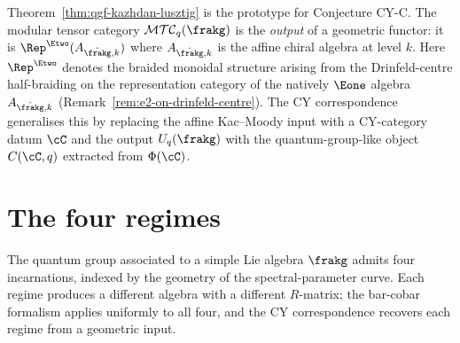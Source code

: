 \begin{remark}
\label{rem:qgf-vol3-standpoint}
Theorem~\ref{thm:qgf-kazhdan-lusztig} is the prototype for Conjecture CY-C. The modular tensor category $\mathcal{MTC}_q(\frakg)$ is the \emph{output} of a geometric functor: it is $\Rep^{\Etwo}(A_{\hat{\frakg}, k})$ where $A_{\hat{\frakg}, k}$ is the affine chiral algebra at level $k$. Here $\Rep^{\Etwo}$ denotes the braided monoidal structure arising from the Drinfeld-centre half-braiding on the representation category of the natively $\Eone$ algebra $A_{\hat{\frakg},k}$ (Remark~\ref{rem:e2-on-drinfeld-centre}). The CY correspondence generalises this by replacing the affine Kac--Moody input with a CY-category datum $\cC$ and the output $U_q(\frakg)$ with the quantum-group-like object $C(\cC, q)$ extracted from $\Phi(\cC)$.
\end{remark}

\section{The four regimes}
\label{sec:qgf-four-regimes}

The quantum group associated to a simple Lie algebra $\frakg$ admits four incarnations, indexed by the geometry of the spectral-parameter curve. Each regime produces a different algebra with a different $R$-matrix; the bar-cobar formalism applies uniformly to all four, and the CY correspondence recovers each regime from a geometric input.

